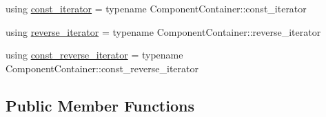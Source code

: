 \begin{DoxyCompactItemize}
\item 
using \mbox{\hyperlink{classmage_1_1_component_manager_acc0d5ab8de4583ae2dd99c7bc0784c95}{const\+\_\+iterator}} = typename Component\+Container\+::const\+\_\+iterator
\item 
using \mbox{\hyperlink{classmage_1_1_component_manager_a33e3e4994e4ec77e3ab587d68dbb8277}{reverse\+\_\+iterator}} = typename Component\+Container\+::reverse\+\_\+iterator
\item 
using \mbox{\hyperlink{classmage_1_1_component_manager_a00481d8beab5d950124f54c0f832da53}{const\+\_\+reverse\+\_\+iterator}} = typename Component\+Container\+::const\+\_\+reverse\+\_\+iterator
\end{DoxyCompactItemize}
\subsection*{Public Member Functions}
